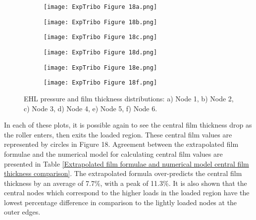 \begin{figure}
	\centering
	\begin{subfigure}[b]{0.49\textwidth}
		\centering
		\texttt{[image: ExpTribo Figure 18a.png]}
		\caption{}
		\label{NodeA}
	\end{subfigure}
	\hfill
	\begin{subfigure}[b]{0.49\textwidth}
		\centering
		\texttt{[image: ExpTribo Figure 18b.png]}
		\caption{}
		\label{NodeB}
	\end{subfigure}
	\hfill
	\begin{subfigure}[b]{0.49\textwidth}
		\centering
		\texttt{[image: ExpTribo Figure 18c.png]}
		\caption{}
		\label{NodeC}
	\end{subfigure}
	\hfill
	\begin{subfigure}[b]{0.49\textwidth}
		\centering
		\texttt{[image: ExpTribo Figure 18d.png]}
		\caption{}
		\label{NodeD}
	\end{subfigure}
	\hfill
	\begin{subfigure}[b]{0.49\textwidth}
		\centering
		\texttt{[image: ExpTribo Figure 18e.png]}
		\caption{}
		\label{NodeE}
	\end{subfigure}
	\hfill
	\begin{subfigure}[b]{0.49\textwidth}
		\centering
		\texttt{[image: ExpTribo Figure 18f.png]}
		\caption{}
		\label{NodeF}
	\end{subfigure}
	\caption{EHL pressure and film thickness distributions: a) Node 1, b) Node 2, c) Node 3, d) Node 4, e) Node 5, f) Node 6.}
	\label{EHL pressure and film thickness distributions}
\end{figure}

In each of these plots, it is possible again to see the central film thickness drop as the roller enters, then exits the loaded region. These central film values are represented by circles in Figure 18. Agreement between the extrapolated film formulae and the numerical model for calculating central film values are presented in Table \ref{Extrapolated film formulae and numerical model central film thickness comparison}. The extrapolated formula over-predicts the central film thickness by an average of 7.7\%, with a peak of 11.3\%. It is also shown that the central nodes which correspond to the higher loads in the loaded region have the lowest percentage difference in comparison to the lightly loaded nodes at the outer edges.

